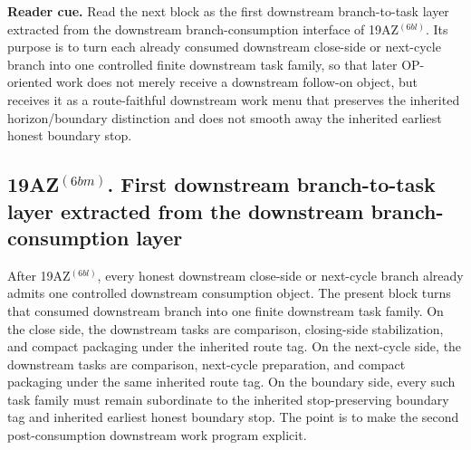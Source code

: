 \noindent\textbf{Reader cue.} Read the next block as the first downstream branch-to-task layer extracted from the downstream branch-consumption interface of 19AZ$^{(6bl)}$. Its purpose is to turn each already consumed downstream close-side or next-cycle branch into one controlled finite downstream task family, so that later OP-oriented work does not merely receive a downstream follow-on object, but receives it as a route-faithful downstream work menu that preserves the inherited horizon/boundary distinction and does not smooth away the inherited earliest honest boundary stop.

\subsection*{19AZ$^{(6bm)}$. First downstream branch-to-task layer extracted from the downstream branch-consumption layer}
\label{sec:first-downstream-branch-to-task-layer-extracted-from-the-downstream-branch-consumption-layer-second-level}
After 19AZ$^{(6bl)}$, every honest downstream close-side or next-cycle branch already admits one controlled downstream consumption object. The present block turns that consumed downstream branch into one finite downstream task family. On the close side, the downstream tasks are comparison, closing-side stabilization, and compact packaging under the inherited route tag. On the next-cycle side, the downstream tasks are comparison, next-cycle preparation, and compact packaging under the same inherited route tag. On the boundary side, every such task family must remain subordinate to the inherited stop-preserving boundary tag and inherited earliest honest boundary stop. The point is to make the second post-consumption downstream work program explicit.

